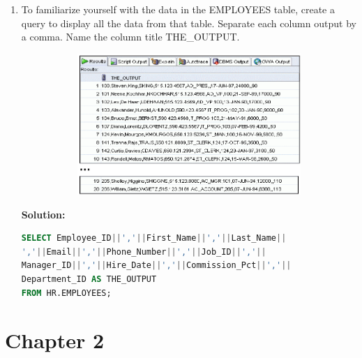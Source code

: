 \documentclass[a4paper,12pt]{article}
\begin{document}
\begin{enumerate}[start=8]
    \item To familiarize yourself with the data in the EMPLOYEES table, create a query to display all the data from that table. Separate each column output by a comma. Name the column title THE\_OUTPUT.
    \begin{figure}[h]
        \centering
        \begin{subfigure}[b]{0.4\linewidth}
            \centering
            \includegraphics[width=\linewidth]{graphics/10.png}
        \end{subfigure}
    \end{figure}

    \textbf{Solution: }
    \begin{lstlisting}[language=SQL, label={lst:employees_data}]
SELECT Employee_ID||','||First_Name||','||Last_Name||
','||Email||','||Phone_Number||','||Job_ID||','||
Manager_ID||','||Hire_Date||','||Commission_Pct||','||
Department_ID AS THE_OUTPUT
FROM HR.EMPLOYEES;
    \end{lstlisting}
    
\end{enumerate}
\newpage
\section*{Chapter 2}
\end{document}
